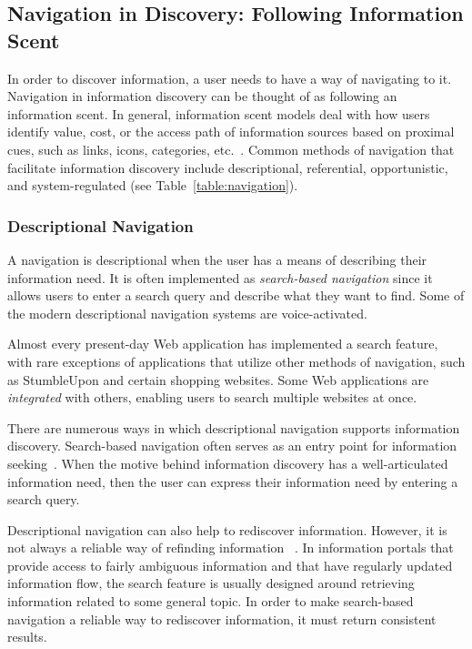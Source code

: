 \documentclass{sigchi}
\begin{document}
{{{\subsection{Navigation in Discovery: Following Information Scent}
In order to discover information, a user needs to have a way of navigating to it. Navigation in information discovery can be thought of as following an information scent. In general, information scent models deal with how users identify value, cost, or the access path of information sources based on proximal cues, such as links, icons, categories, etc.~\cite{pirolli1999information}. Common methods of navigation that facilitate information discovery include descriptional, referential, opportunistic, and system-regulated (see Table~\ref{table:navigation}). 

{\subsubsection{Descriptional Navigation}
A navigation is descriptional when the user has a means of describing their information need. It is often implemented as \textit{search-based navigation} since it allows users to enter a search query and describe what they want to find. Some of the modern descriptional navigation systems are voice-activated. 

Almost every present-day Web application has implemented a search feature, with rare exceptions of applications that utilize other methods of navigation, such as StumbleUpon and certain shopping websites. Some Web applications are \textit{integrated} with others, enabling users to search multiple websites at once.    

There are numerous ways in which descriptional navigation supports information discovery. Search-based navigation often serves as an entry point for information seeking~\cite{levene2011introduction}. When the motive behind information discovery has a well-articulated information need, then the user can express their information need by entering a search query. 

Descriptional navigation can also help to rediscover information. However, it is not always a reliable way of refinding information ~\cite{cockburn2003improving}. In information portals that provide access to fairly ambiguous information and that have regularly updated information flow, the search feature is usually designed around retrieving information related to some general topic. In order to make search-based navigation a reliable way to rediscover information, it must return consistent results. 
} %


}}}
\end{document}
